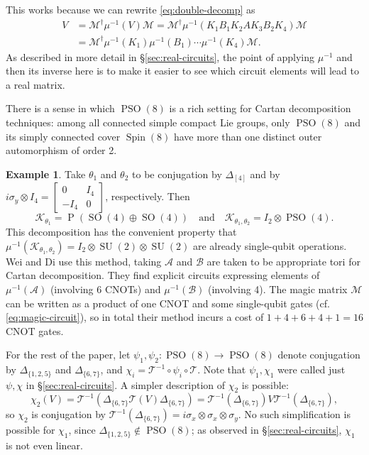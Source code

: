 \documentclass[reqno]{amsart}
\theoremstyle{definition} \newtheorem{example}[theorem]{Example}
\newcommand{\SU}{\operatorname{SU}}
\newcommand{\SO}{\operatorname{SO}}
\newcommand{\PSO}{\operatorname{PSO}}
\renewcommand{\P}{\operatorname{P}}
\newcommand{\secsymbol}{§}
\newcommand{\K}{\mathcal{K}}
\newcommand{\A}{\mathcal{A}}
\newcommand{\B}{\mathcal{B}}
\newcommand{\T}{\mathcal{T}}
\newcommand{\M}{\mathcal{M}}
\begin{document}
This works because we can rewrite \eqref{eq:double-decomp} as
\begin{align*}
V &= \M^\dagger \mu^{-1}(V) \M = \M^\dagger \mu^{-1}(K_1 B_1 K_2 A K_3 B_2 K_4) \M\\
&= \M^\dagger \mu^{-1}(K_1)\mu^{-1}(B_1)\cdots \mu^{-1}(K_4)\M.
\end{align*}
As described in more detail in \secsymbol \ref{sec:real-circuits}, the point of applying $\mu^{-1}$ and then its inverse here is to make it easier to see which circuit elements will lead to a real matrix.

There is a sense in which $\PSO(8)$ is a rich setting for Cartan decomposition techniques: among all connected simple compact Lie groups, only $\PSO(8)$ and its simply connected cover $\operatorname{Spin}(8)$ have more than one distinct outer automorphism of order 2.

\begin{example} \label{ex:wei-di}
Take $\theta_1$ and $\theta_2$ to be conjugation by $\Delta_{[4]}$ and by $i\sigma_y \otimes I_4 = \left[ \begin{smallmatrix} 0 & I_4 \\ -I_4 & 0 \end{smallmatrix} \right]$, respectively. Then
\begin{equation*}
\K_{\theta_1} = \P(\SO(4) \oplus \SO(4)) \quad \text{and} \quad \K_{\theta_1,\theta_2} = I_2 \otimes \PSO(4).
\end{equation*}
This decomposition has the convenient property that $\mu^{-1}(\K_{\theta_1,\theta_2}) = I_2 \otimes \SU(2) \otimes \SU(2)$ are already single-qubit operations. Wei and Di use this method, taking $\A$ and $\B$ are taken to be appropriate tori for Cartan decomposition. They find explicit circuits expressing elements of $\mu^{-1}(\A)$ (involving 6 CNOTs) and $\mu^{-1}(\B)$ (involving 4). The magic matrix $\M$ can be written as a product of one CNOT and some single-qubit gates (cf. \eqref{eq:magic-circuit}), so in total their method incurs a cost of $1+4+6+4+1 = 16$ CNOT gates.
\end{example}  

For the rest of the paper, let $\psi_1, \psi_2 : \PSO(8) \to \PSO(8)$ denote conjugation by $\Delta_{\{1,2,5\}}$ and $\Delta_{\{6,7\}}$, and $\chi_i = \T^{-1} \circ \psi_i \circ \T$. Note that $\psi_1, \chi_1$ were called just $\psi,\chi$ in \secsymbol\ref{sec:real-circuits}. A simpler description of $\chi_2$ is possible:
\begin{equation*}
\chi_2(V) = \T^{-1}(\Delta_{\{6,7\}} \T(V)\Delta_{\{6,7\}}) = \T^{-1}(\Delta_{\{6,7\}})V \T^{-1}(\Delta_{\{6,7\}}),
\end{equation*}
so $\chi_2$ is conjugation by $\T^{-1}(\Delta_{\{6,7\}}) = i\sigma_x \otimes \sigma_x \otimes \sigma_y$. No such simplification is possible for $\chi_1$, since $\Delta_{\{1,2,5\}} \notin \PSO(8)$; as observed in \secsymbol\ref{sec:real-circuits}, $\chi_1$ is not even linear.
\end{document}

